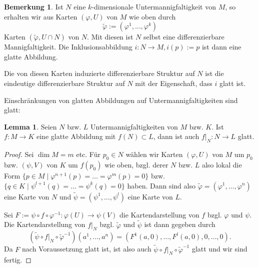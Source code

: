 \documentclass[a4paper]{scrbook}
\numberwithin{equation}{chapter}
\theoremstyle{definition}
\newtheorem{lemma}[defn]{Lemma}
\newtheorem{bem}[defn]{Bemerkung}
\begin{document}
\begin{bem}
	Ist $N$ eine $k$-dimensionale Untermannigfaltigkeit von $M$, so erhalten wir aus Karten $(\varphi,U)$ von $M$ wie oben durch
	\[\tilde\varphi := (\varphi^1, \dots, \varphi^k)\]
	Karten $(\tilde\varphi, U\cap N)$ von $N$. Mit diesen ist $N$ selbst eine differenzierbare Mannigfaltigkeit. Die Inklusionsabbildung $i\colon N \to M, i(p) := p$ ist dann eine glatte Abbildung.

	Die von diesen Karten induzierte differenzierbare Struktur auf $N$ ist die eindeutige differenzierbare Struktur auf $N$ mit der Eigenschaft, dass $i$ glatt ist.
\end{bem}
Einschränkungen von glatten Abbildungen auf Untermannigfaltigkeiten sind glatt:
\begin{lemma}
	Seien $N$ bzw. $L$ Untermannigfaltigkeiten von $M$ bzw. $K$. Ist $f\colon M\to K$ eine glatte Abbildung mit $f(N) \subset L$, dann ist auch $f|_N \colon N \to L$ glatt.

	\begin{proof}
		Sei $\dim M = m$ etc. Für $p_0 \in N$ wählen wir Karten $(\varphi,U)$ von $M$ um $p_0$ bzw. $(\psi,V)$ von $K$ um $f(p_0)$ wie oben, bzgl. derer $N$ bzw. $L$ also lokal die Form $\{p \in M \mid \varphi^{n+1}(p) = \dots = \varphi^{m}(p) = 0\}$ bzw. $\{q \in K \mid \psi^{l+1}(q) = \dots = \psi^{k}(q) = 0\}$ haben. Dann sind also $\tilde\varphi = (\varphi^1, \dots, \varphi^n)$ eine Karte von $N$ und $\tilde\psi = (\psi^1, \dots, \psi^l)$ eine Karte von $L$.

		Sei $F := \psi \circ f \circ \varphi^{-1} \colon \varphi(U) \to \psi(V)$ die Kartendarstellung von $f$ bzgl. $\varphi$ und $\psi$. Die Kartendarstellung von $f|_N$ bzgl. $\tilde\varphi$ und $\tilde\psi$ ist dann gegeben durch
		\[(\tilde\psi \circ f|_N \circ \tilde\varphi^{-1}) (a^1,\dots,a^n) = (F^1(a,0), \dots, F^l(a,0), 0,\dots,0).\]
		Da $F$ nach Voraussetzung glatt ist, ist also auch $\tilde\psi \circ f|_N \circ \tilde\varphi^{-1}$ glatt und wir sind fertig.
	\end{proof}
\end{lemma}
\end{document}
